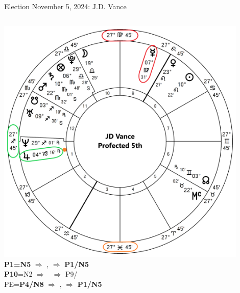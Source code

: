 \begin{frame}[t]{Election November 5, 2024: J.D. Vance}
\begin{columns}[T, onlytextwidth]
\vspace{-1em}
{\includegraphics[width=0.9\textwidth]{charts/Vance-Prof-5th.png}}
\fontsize{8pt}{9pt}\selectfont
\textbf{\dgreen P1=N5}
	$\Rightarrow$ \Jupiter\small\Retrograde, $\Rightarrow$ \textbf{\dgreen P1/N5}\\
\textbf{\red P10}=N2
	$\Rightarrow$ \Mercury\, $\Rightarrow$ P9/\\
PE=\textbf{\dgreen P4/N8}
	 $\Rightarrow$ \Jupiter\small\Retrograde, $\Rightarrow$ \textbf{\dgreen P1/N5}

\end{columns}
\end{frame}



